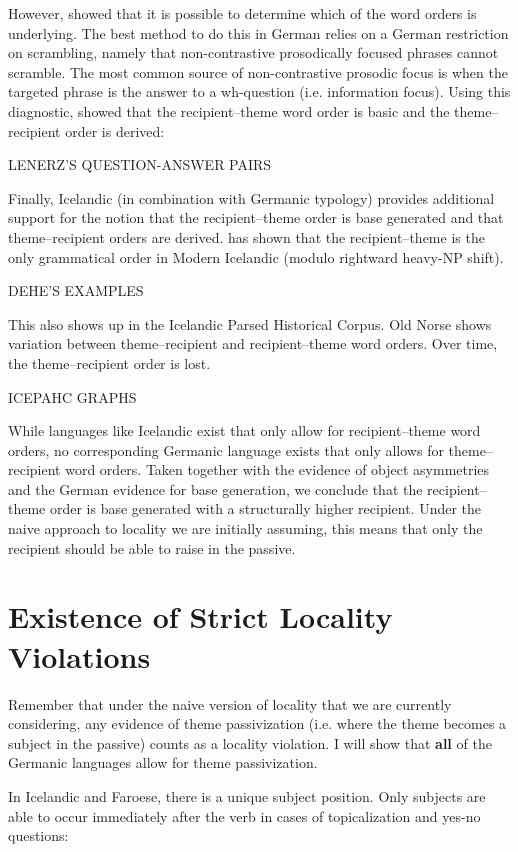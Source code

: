 However, \cite{Lenerz.1977} showed that it is possible to determine which of the word orders is underlying. The best method to do this in German relies on a German restriction on scrambling, namely that non-contrastive prosodically focused phrases cannot scramble. The most common source of non-contrastive prosodic focus is when the targeted phrase is the answer to a wh-question (i.e. information focus). Using this diagnostic, \cite{Lenerz.1977} showed that the recipient--theme word order is basic and the theme--recipient order is derived:
\bigskip

LENERZ'S QUESTION-ANSWER PAIRS
\bigskip

Finally, Icelandic (in combination with Germanic typology) provides additional support for the notion that the recipient--theme order is base generated and that theme--recipient orders are derived. \cite{Dehe.2004} has shown that the recipient--theme is the only grammatical order in Modern Icelandic (modulo rightward heavy-NP shift). 
\bigskip

DEHE'S EXAMPLES
\bigskip

This also shows up in the Icelandic Parsed Historical Corpus. Old Norse shows variation between theme--recipient and recipient--theme word orders. Over time, the theme--recipient order is lost.
\bigskip

ICEPAHC GRAPHS
\bigskip

While languages like Icelandic exist that only allow for recipient--theme word orders, no corresponding Germanic language exists that only allows for theme--recipient word orders. Taken together with the evidence of object asymmetries and the German evidence for base generation, we conclude that the recipient--theme order is base generated with a structurally higher recipient. Under the naive approach to locality we are initially assuming, this means that only the recipient should be able to raise in the passive.

\section{Existence of Strict Locality Violations}
Remember that under the naive version of locality that we are currently considering, any evidence of theme passivization (i.e. where the theme becomes a subject in the passive) counts as a locality violation. I will show that \textbf{all} of the Germanic languages allow for theme passivization.

In Icelandic and Faroese, there is a unique subject position. Only subjects are able to occur immediately after the verb in cases of topicalization and yes-no questions:
 \bigskip

